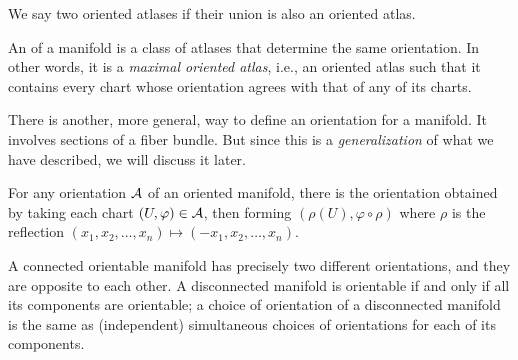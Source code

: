 \begin{definition}
We say two oriented atlases  if their
union is also an oriented atlas.
\end{definition}

\begin{definition}
An  of a manifold is a class of atlases that
determine the same orientation. In other words, it is a \emph{maximal oriented atlas},
i.e., an oriented atlas such that it contains every chart whose
orientation agrees with that of any of its charts.
\end{definition}

\begin{remark}
There is another, more general, way to define an orientation for a
manifold. It involves sections of a fiber bundle. But since this is a
\emph{generalization} of what we have described, we will discuss it
later.
\end{remark}

\begin{definition}
For any orientation $\mathcal{A}$ of an oriented manifold, there is the 
orientation obtained by taking each chart $(U,\varphi)\in\mathcal{A}$,
then forming $(\rho(U),\varphi\circ\rho)$ where $\rho$ is the reflection
$(x_{1}, x_{2},\dots, x_{n})\mapsto(-x_{1},x_{2},\dots,x_{n})$.
\end{definition}

\begin{proposition}
A connected orientable manifold has precisely two different
orientations, and they are opposite to each other. A disconnected
manifold is orientable if and only if all its components are orientable;
a choice of orientation of a disconnected manifold is the same as
(independent) simultaneous choices of orientations for each of its components.
\end{proposition}


\endinput
